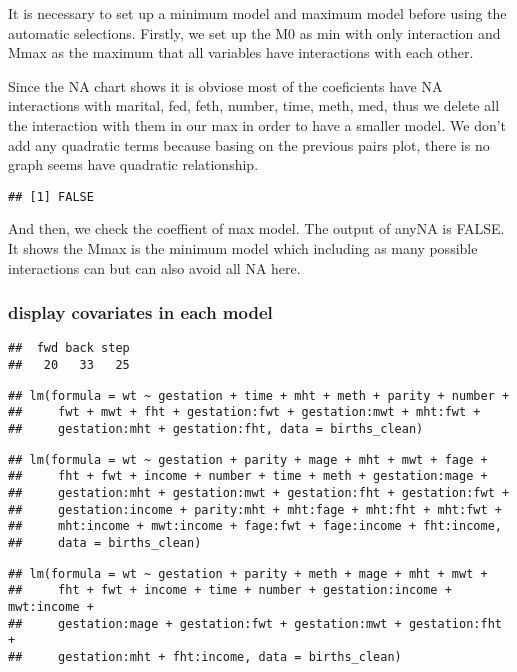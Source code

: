 \documentclass[]{article}
\begin{document}
It is necessary to set up a minimum model and maximum model before using
the automatic selections. Firstly, we set up the M0 as min with only
interaction and Mmax as the maximum that all variables have interactions
with each other.

Since the NA chart shows it is obviose most of the coeficients have NA
interactions with marital, fed, feth, number, time, meth, med, thus we
delete all the interaction with them in our max in order to have a
smaller model. We don't add any quadratic terms because basing on the
previous pairs plot, there is no graph seems have quadratic
relationship.

\begin{verbatim}
## [1] FALSE
\end{verbatim}

And then, we check the coeffient of max model. The output of anyNA is
FALSE. It shows the Mmax is the minimum model which including as many
possible interactions can but can also avoid all NA here.

\subsubsection{display covariates in each
model}\label{display-covariates-in-each-model}

\begin{verbatim}
##  fwd back step 
##   20   33   25
\end{verbatim}

\begin{verbatim}
## lm(formula = wt ~ gestation + time + mht + meth + parity + number + 
##     fwt + mwt + fht + gestation:fwt + gestation:mwt + mht:fwt + 
##     gestation:mht + gestation:fht, data = births_clean)
\end{verbatim}

\begin{verbatim}
## lm(formula = wt ~ gestation + parity + mage + mht + mwt + fage + 
##     fht + fwt + income + number + time + meth + gestation:mage + 
##     gestation:mht + gestation:mwt + gestation:fht + gestation:fwt + 
##     gestation:income + parity:mht + mht:fage + mht:fht + mht:fwt + 
##     mht:income + mwt:income + fage:fwt + fage:income + fht:income, 
##     data = births_clean)
\end{verbatim}

\begin{verbatim}
## lm(formula = wt ~ gestation + parity + meth + mage + mht + mwt + 
##     fht + fwt + income + time + number + gestation:income + mwt:income + 
##     gestation:mage + gestation:fwt + gestation:mwt + gestation:fht + 
##     gestation:mht + fht:income, data = births_clean)
\end{verbatim}
\end{document}
